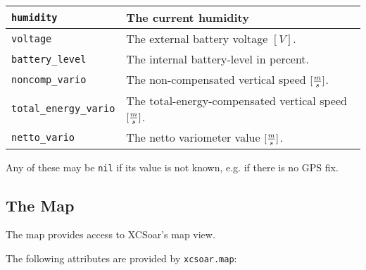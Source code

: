 \begin{maxipage}
\begin{tabularx}{1.9\textwidth}{l|X}
\hline

\verb|humidity| & The current humidity \\

\hline

\verb|voltage| & The external battery voltage
$[{V}]$. \\

\hline

\verb|battery_level| & The internal battery-level in percent. \\

\hline

\verb|noncomp_vario| & The non-compensated vertical speed
$[{m \over s}]$. \\

\hline

\verb|total_energy_vario| & The total-energy-compensated vertical speed
$[{m \over s}]$. \\

\hline

\verb|netto_vario| & The netto variometer value
$[{m \over s}]$. \\

\end{tabularx}
\end{maxipage}

Any of these may be \verb|nil| if its value is not known, e.g. if
there is no GPS fix.

\subsection{The Map}

The map provides access to XCSoar's map view.

The following attributes are provided by \verb|xcsoar.map|:

